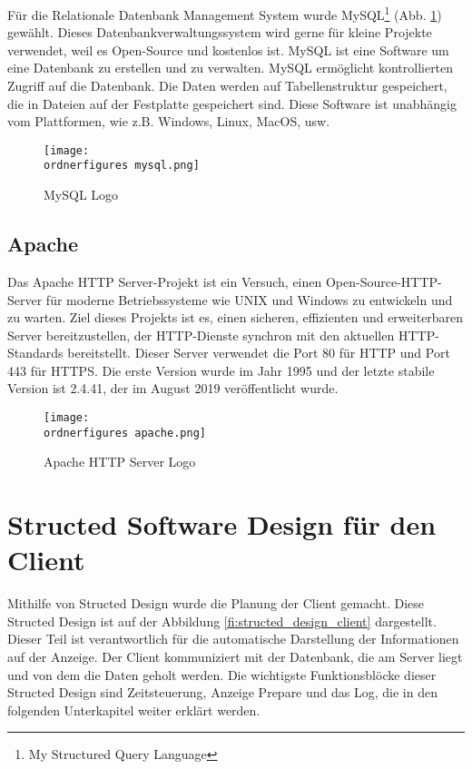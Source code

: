 F\"{u}r die Relationale Datenbank Management System wurde MySQL\footnote{My Structured Query Language} (Abb. \ref{fi:mysql}) gew\"{a}hlt. Dieses Datenbankverwaltungssystem wird gerne f\"{u}r kleine Projekte verwendet, weil es Open-Source und kostenlos ist. MySQL ist eine Software um eine Datenbank zu erstellen und zu verwalten. MySQL erm\"{o}glicht kontrollierten Zugriff auf die Datenbank. Die Daten werden auf Tabellenstruktur gespeichert, die in Dateien auf der Festplatte gespeichert sind. Diese Software ist unabh\"angig vom Plattformen, wie z.B. Windows, Linux, MacOS, usw.

\begin{figure}[H]
	\centering
	\texttt{[image: \\ordnerfigures mysql.png]}
	\caption{MySQL Logo \cite{40_mysql_img}}
	\label{fi:mysql}
\end{figure}
\subsection{Apache}
Das Apache HTTP Server-Projekt ist ein Versuch, einen Open-Source-HTTP-Server f\"{u}r moderne Betriebssysteme wie UNIX und Windows zu entwickeln und zu warten. Ziel dieses Projekts ist es, einen sicheren, effizienten und erweiterbaren Server bereitzustellen, der HTTP-Dienste synchron mit den aktuellen HTTP-Standards bereitstellt. Dieser Server verwendet die Port 80 f\"{u}r HTTP und Port 443 f\"{u}r HTTPS. Die erste Version wurde im Jahr 1995 und der letzte stabile Version ist 2.4.41, der im August 2019 ver\"{o}ffentlicht wurde. \cite{40_apache}



\begin{figure}[H]
	\centering
	\texttt{[image: \\ordnerfigures apache.png]}
	\caption{Apache HTTP Server Logo \cite{40_apache_img}}
	\label{fi:apache}
\end{figure}


\section{Structed Software Design für den Client}

Mithilfe von Structed Design wurde die Planung der Client gemacht. Diese Structed Design ist auf der Abbildung \ref{fi:structed_design_client} dargestellt. 
Dieser Teil ist verantwortlich f\"{u}r die automatische Darstellung der Informationen auf der Anzeige. Der Client kommuniziert mit der Datenbank, die am Server liegt und von dem die Daten geholt werden. Die wichtigste Funktionsbl\"{o}cke dieser Structed Design sind Zeitsteuerung, Anzeige Prepare und das Log, die in den folgenden Unterkapitel weiter erkl\"{a}rt werden.


